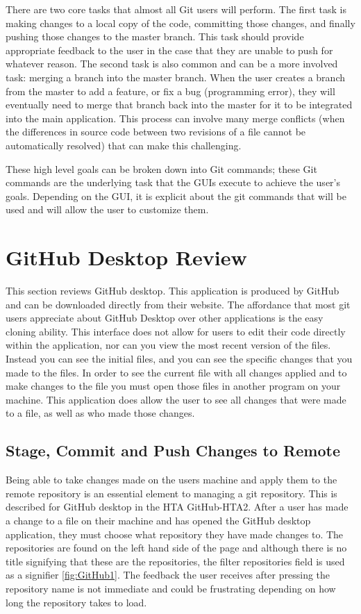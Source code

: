 \documentclass{sigchi}
\begin{document}
There are two core tasks that almost all Git users will perform. The first task is making changes to a local copy of the code,
committing those changes, and finally pushing those changes to the master branch. This task should 
provide appropriate feedback to the user in the case that they are unable to push for whatever reason.
The second task is also common and can be a more involved task: merging a branch into the master branch. 
When the user creates a branch from the master to add a feature, or fix a bug (programming error), they
will eventually need to merge that branch back into the master for it to be integrated into the main application. 
This process can involve many merge conflicts (when the differences in source code between two revisions of
a file cannot be automatically resolved) that can make this challenging.

These high level goals can be broken down into Git commands; these Git commands
are the underlying task that the GUIs execute to achieve the user's goals. 
Depending on the GUI, it is explicit about the git commands that will be used 
and will allow the user to customize them. 

\section{GitHub Desktop Review}
This section reviews GitHub desktop.
This application is produced by GitHub and can be downloaded directly from 
their website. The affordance that most git users appreciate about GitHub Desktop over 
other applications is the easy cloning ability. This interface does not allow for users 
to edit their code directly within the application, nor can you view the most recent version of 
the files. Instead you can see the initial files, and you can see the specific changes
that you made to the files. In order to see the current file with all changes applied
and to make changes to the file you must open those files in another program on your 
machine. This application does allow the user to see all changes that were made to a file, 
as well as who made those changes.
 
\subsection{Stage, Commit and Push Changes to Remote}
Being able to take changes made on the users machine and apply them to the remote repository 
is an essential element to managing a git repository. This is described for GitHub desktop in
the HTA GitHub-HTA2. After a user has made a change to a file on their machine and has 
opened the GitHub desktop application, they must choose what repository they have made changes 
to. The repositories are found on the left hand side of the page and although there is no title 
signifying that these are the repositories, the filter repositories field is used as a signifier \ref{fig:GitHub1}. The feedback the user receives after pressing the repository name is not immediate and could be
frustrating depending on how long the repository takes to load. 
\end{document}
